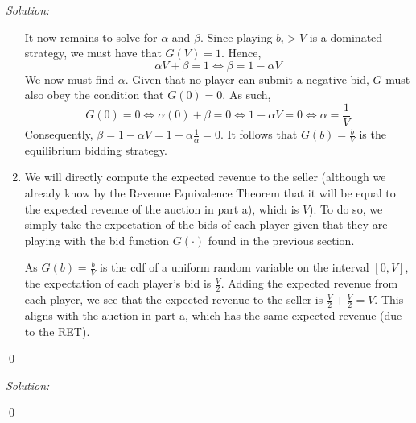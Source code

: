 \documentclass[12pt]{article}
\newenvironment{problem}[2][Problem]{\begin{trivlist}
\item[\hskip \labelsep {\bfseries #1}\hskip \labelsep {\bfseries #2.}]}{\end{trivlist}}
\newenvironment{sol}
    {\emph{Solution:}
    }
    {
    \qed
    }
\begin{document}
\begin{sol}
\begin{enumerate}[label=\alph*) ]
    It now remains to solve for $\alpha$ and $\beta$. Since playing $b_i > V$ is a dominated strategy, we must have that $G(V) = 1$. Hence,
    \[\alpha V + \beta = 1 \iff \beta = 1 - \alpha V\]
    We now must find $\alpha$. Given that no player can submit a negative bid, $G$ must also obey the condition that $G(0) = 0$. As such,
    \[G(0) = 0 \iff \alpha (0) + \beta = 0 \iff 1 - \alpha V = 0 \iff \alpha = \frac{1}{V}\]
    Consequently, $\beta = 1 - \alpha V = 1- \alpha \frac{1}{\alpha} = 0$. It follows that $G(b) = \frac{b}{V}$ is the equilibrium bidding strategy.
    \item We will directly compute the expected revenue to the seller (although we already know by the Revenue Equivalence Theorem that it will be equal to the expected revenue of the auction in part a), which is $V$). To do so, we simply take the expectation of the bids of each player given that they are playing with the bid function $G(\cdot)$ found in the previous section.
    
    As $G(b) = \frac{b}{V}$ is the cdf of a uniform random variable on the interval $[0,V]$, the expectation of each player's bid is $\frac{V}{2}$. Adding the expected revenue from each player, we see that the expected revenue to the seller is $\frac{V}{2} + \frac{V}{2} = V$. This aligns with the auction in part a, which has the same expected revenue (due to the RET).
\end{enumerate}
\end{sol}
\begin{problem}{3}
\end{problem}
\begin{sol}

\end{sol}
\end{document}
